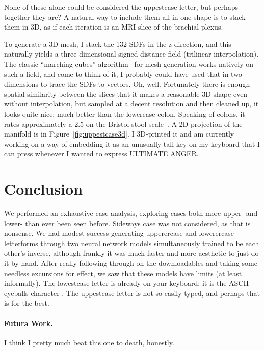 \documentclass[twocolumn]{article}
\begin{document}
None of these alone could be considered the uppestcase letter, but
perhaps together they are? A natural way to include them all in one
shape is to stack them in 3D, as if each iteration is an MRI slice of
the brachial plexus.

To generate a 3D mesh, I stack the 132 SDFs in the z direction, and
this naturally yields a three-dimensional signed distance field
(trilinear interpolation). The classic ``marching cubes''
algorithm~\cite{lorensen1987marching} for mesh generation works
natively on such a field, and come to think of it, I probably could
have used that in two dimensions to trace the SDFs to vectors. Oh,
well. Fortunately there is enough spatial similarity between the
slices that it makes a reasonable 3D shape even without interpolation,
but sampled at a decent resolution and then cleaned up, it looks quite
nice; much better than the lowercase colon. Speaking of colons, it
rates approximately a 2.5 on the Bristol stool
scale~\cite{lewis1997bristol}. A 2D projection of the manifold is in
Figure~\ref{fig:uppestcase3d}. I 3D-printed it and am currently
working on a way of embedding it as an unusually tall key on my
keyboard that I can press whenever I wanted to express ULTIMATE ANGER.

\section{Conclusion}
We performed an exhaustive case analysis, exploring cases both more
upper- and lower- than ever been seen before. Sideways case was not
considered, as that is nonsense. We had modest success generating
upperercase and lowerercase letterforms through two neural network
models simultaneously trained to be each other's inverse, although
frankly it was much faster and more aesthetic to just do it by hand.
After really following through on the downloadables and taking some
needless excursions for effect, we saw that these models have
limits (at least informally). The lowestcase letter is already
on your keyboard; it is the ASCII eyeballs character .
The uppestcase letter is not so easily typed, and perhaps that
is for the best.

\paragraph{Futura Work.}
I think I pretty much beat this one to death, honestly.
\end{document}
